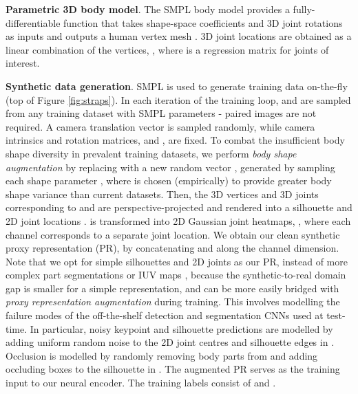 \documentclass{bmvc2k}
\begin{document}
\noindent \textbf{Parametric 3D body model}. The SMPL \cite{SMPL:2015} body model provides a fully-differentiable function  that takes shape-space coefficients  and 3D joint rotations  as inputs and outputs a human vertex mesh . 3D joint locations are obtained as a linear combination of the vertices, , where  is a regression matrix for  joints of interest.

\noindent \textbf{Synthetic data generation}. SMPL is used to generate training data on-the-fly (top of Figure \ref{fig:straps}). In each iteration of the training loop,  and  are sampled from any training dataset with SMPL parameters - paired images are not required. A camera translation vector  is sampled randomly, while camera intrinsics and rotation matrices,  and , are fixed. To combat the insufficient body shape diversity in prevalent training datasets, we perform \textit{body shape augmentation} by replacing  with a new random vector , generated by sampling each shape parameter , where  is chosen (empirically) to provide greater body shape variance than current datasets. Then, the 3D vertices  and 3D joints  corresponding to  and  are perspective-projected and rendered \cite{kato2018renderer} into a silhouette  and 2D joint locations .  is transformed into 2D Gaussian joint heatmaps, , where each channel corresponds to a separate joint location. We obtain our clean synthetic proxy representation (PR),  by concatenating  and  along the channel dimension. Note that we opt for simple silhouettes and 2D joints as our PR, instead of more complex part segmentations or IUV maps \cite{Guler2018DensePose}, because the synthetic-to-real domain gap is smaller for a simple representation, and can be more easily bridged with \textit{proxy representation augmentation} during training. This involves modelling the failure modes of the off-the-shelf detection and segmentation CNNs used at test-time. In particular, noisy keypoint and silhouette predictions are modelled by adding uniform random noise to the 2D joint centres and silhouette edges in . Occlusion is modelled by randomly removing body parts from and adding occluding boxes to the silhouette in . The augmented PR  serves as the training input to our neural encoder. The training labels consist of  and .
\end{document}

